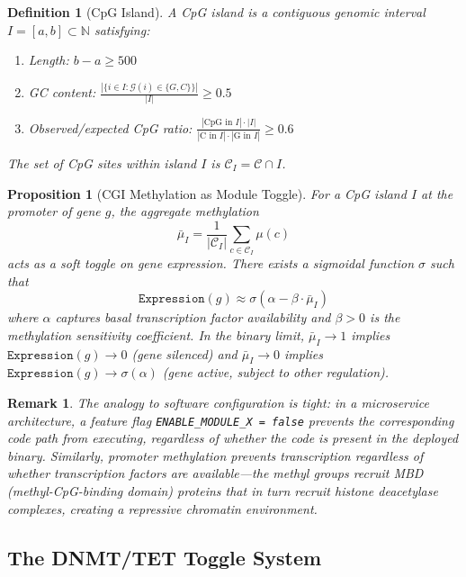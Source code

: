 \documentclass[12pt,a4paper]{article}
\newtheorem{proposition}[theorem]{Proposition}
\newtheorem{definition}[theorem]{Definition}
\newtheorem{remark}[theorem]{Remark}
\newcommand{\Expr}{\texttt{Expression}}
\begin{document}
\begin{definition}[CpG Island]
\label{def:cpg-island}
A \emph{CpG island} is a contiguous genomic interval $I = [a, b] \subset \mathbb{N}$ satisfying:
\begin{enumerate}[label=(\alph*)]
    \item Length: $b - a \geq 500$
    \item GC content: $\frac{|\{i \in I : \mathcal{G}(i) \in \{G, C\}\}|}{|I|} \geq 0.5$
    \item Observed/expected CpG ratio: $\frac{|\textrm{CpG in } I| \cdot |I|}{|\textrm{C in } I| \cdot |\textrm{G in } I|} \geq 0.6$
\end{enumerate}
The set of CpG sites within island $I$ is $\mathcal{C}_I = \mathcal{C} \cap I$.
\end{definition}

\begin{proposition}[CGI Methylation as Module Toggle]
\label{prop:cgi-toggle}
For a CpG island $I$ at the promoter of gene $g$, the aggregate methylation
\[
    \bar{\mu}_I = \frac{1}{|\mathcal{C}_I|} \sum_{c \in \mathcal{C}_I} \mu(c)
\]
acts as a soft toggle on gene expression. There exists a sigmoidal function $\sigma$ such that
\[
    \Expr(g) \approx \sigma\!\left(\alpha - \beta \cdot \bar{\mu}_I\right)
\]
where $\alpha$ captures basal transcription factor availability and $\beta > 0$ is the methylation sensitivity coefficient. In the binary limit, $\bar{\mu}_I \to 1$ implies $\Expr(g) \to 0$ (gene silenced) and $\bar{\mu}_I \to 0$ implies $\Expr(g) \to \sigma(\alpha)$ (gene active, subject to other regulation).
\end{proposition}

\begin{remark}
The analogy to software configuration is tight: in a microservice architecture, a feature flag \texttt{ENABLE\_MODULE\_X = false} prevents the corresponding code path from executing, regardless of whether the code is present in the deployed binary. Similarly, promoter methylation prevents transcription regardless of whether transcription factors are available---the methyl groups recruit MBD (methyl-CpG-binding domain) proteins that in turn recruit histone deacetylase complexes, creating a repressive chromatin environment.
\end{remark}

\subsection{The DNMT/TET Toggle System}
\end{document}
